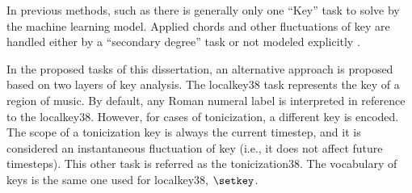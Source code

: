 
In previous methods, such as \textcite{chen2018functional,
chen2019harmony, micchi2020not, micchi2021deep,
mcleod2021modular} there is generally only one ``Key'' task
to solve by the machine learning model. Applied chords and
other fluctuations of key are handled either by a
``secondary degree'' task \parencite{chen2021attend,
micchi2021deep} or not modeled explicitly
\parencite{mcleod2021modular}.

In the proposed tasks of this dissertation, an alternative
approach is proposed based on two layers of key analysis.
The \gls{localkey38} task represents the key of a region of
music. By default, any Roman numeral label is interpreted in
reference to the \gls{localkey38}. However, for cases of
tonicization, a different key is encoded. The scope of a
tonicization key is always the current timestep, and it is
considered an instantaneous fluctuation of key (i.e., it
does not affect future timesteps). This other task is
referred as the \gls{tonicization38}. The vocabulary of keys
is the same one used for \gls{localkey38}, $\setkey$.
